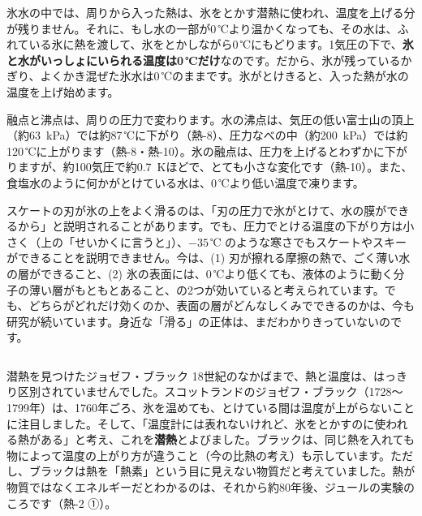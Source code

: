 氷水の中では、周りから入った熱は、氷をとかす潜熱に使われ、温度を上げる分が残りません。それに、もし水の一部が0\,℃より温かくなっても、その水は、ふれている氷に熱を渡して、氷をとかしながら0\,℃にもどります。1気圧の下で、\textbf{氷と水がいっしょにいられる温度は0\,℃だけ}なのです。だから、氷が残っているかぎり、よくかき混ぜた氷水は0\,℃のままです。氷がとけきると、入った熱が水の温度を上げ始めます。

\begin{seikaku}
融点と沸点は、周りの圧力で変わります。水の沸点は、気圧の低い富士山の頂上（約\qty{63}{kPa}）では約87\,℃に下がり（熱-8）、圧力なべの中（約\qty{200}{kPa}）では約120\,℃に上がります（熱-8・熱-10）。氷の融点は、圧力を上げるとわずかに下がりますが、約100気圧で約\qty{0.7}{K}ほどで、とても小さな変化です（熱-10）。また、食塩水のように何かがとけている水は、0\,℃より低い温度で凍ります。
\end{seikaku}

\begin{phmada}
スケートの刃が氷の上をよく滑るのは、「刃の圧力で氷がとけて、水の膜ができるから」と説明されることがあります。でも、圧力でとける温度の下がり方は小さく（上の「せいかくに言うと」）、$-35$\,℃ のような寒さでもスケートやスキーができることを説明できません。今は、(1) 刃が擦れる摩擦の熱で、ごく薄い水の層ができること、(2) 氷の表面には、0\,℃より低くても、液体のように動く分子の薄い層がもともとあること、の2つが効いていると考えられています。でも、どちらがどれだけ効くのか、表面の層がどんなしくみでできるのかは、今も研究が続いています。身近な「滑る」の正体は、まだわかりきっていないのです。
\end{phmada}

\begin{column}{潜熱を見つけたジョゼフ・ブラック}
18世紀のなかばまで、熱と温度は、はっきり区別されていませんでした。スコットランドのジョゼフ・ブラック（1728〜1799年）は、1760年ごろ、氷を温めても、とけている間は温度が上がらないことに注目しました。そして、「温度計には表れないけれど、氷をとかすのに使われる熱がある」と考え、これを\textbf{潜熱}とよびました。ブラックは、同じ熱を入れても物によって温度の上がり方が違うこと（今の比熱の考え）も示しています。ただし、ブラックは熱を「熱素」という目に見えない物質だと考えていました。熱が物質ではなくエネルギーだとわかるのは、それから約80年後、ジュールの実験のころです（熱-2 ①）。
\end{column}

